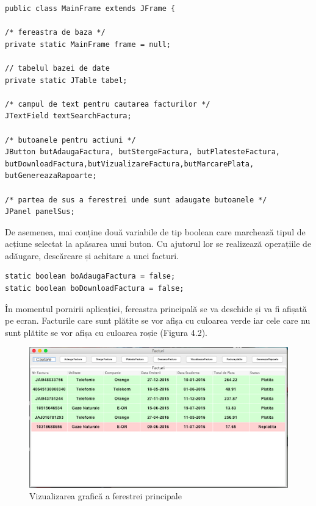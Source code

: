 \documentclass[12pt]{book}
\begin{document}
\begin{lstlisting}[frame=single, caption=Elementele ferestrei principale]
public class MainFrame extends JFrame {

/* fereastra de baza */
private static MainFrame frame = null;

// tabelul bazei de date
private static JTable tabel;

/* campul de text pentru cautarea facturilor */
JTextField textSearchFactura;

/* butoanele pentru actiuni */
JButton butAdaugaFactura, butStergeFactura, butPlatesteFactura, 
butDownloadFactura,butVizualizareFactura,butMarcarePlata,
butGenereazaRapoarte;

/* partea de sus a ferestrei unde sunt adaugate butoanele */
JPanel panelSus;

\end{lstlisting}

De asemenea, mai conține două variabile de tip boolean care marchează tipul de acțiune selectat la apăsarea unui buton. Cu ajutorul lor se realizează operațiile de adăugare, descărcare și achitare a unei facturi.\\

\begin{lstlisting}[frame=single, caption=Variabilele ajutătoare care ne informează despre acțiunea aleasă]
static boolean boAdaugaFactura = false;
static boolean boDownloadFactura = false;
\end{lstlisting}

În momentul pornirii aplicației, fereastra principală se va deschide și va fi afișată pe ecran. Facturile care sunt plătite se vor afișa cu culoarea verde iar cele care nu sunt plătite se vor afișa cu culoarea roșie (Figura 4.2).

\begin{figure}[!ht]
	\centering
	\includegraphics{FereastraPrincipalaVizualizare}
	\caption{Vizualizarea grafică a ferestrei principale}
\end{figure}
\end{document}
